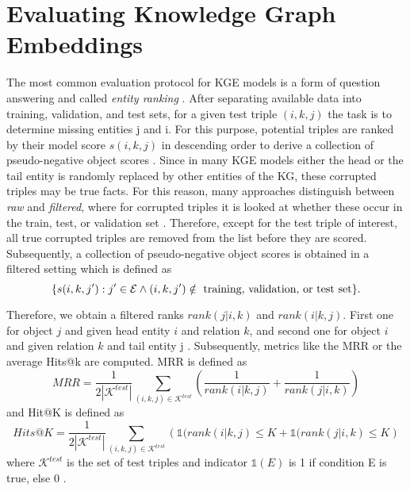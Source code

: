 \section{Evaluating Knowledge Graph Embeddings} 
\label{sec:evaluating_knowledge_graph_embeddings}
%
The most common evaluation protocol for \ac{KGE} models is a form of question answering and called \textit{entity ranking} \cite{Ruffinelli2020You}.
After separating available data into training, validation, and test sets, for a given test triple $(i,k,j)$ the task is to determine missing entities j and i.
For this purpose, potential triples are ranked by their model score $s(i, k, j)$ in descending order to derive a collection of pseudo-negative object scores \cite{Ruffinelli2020You}.
Since in many \ac{KGE} models either the head or the tail entity is randomly replaced by other entities of the \ac{KG}, these corrupted triples may be true facts.
For this reason, many approaches distinguish between \textit{raw} and \textit{filtered}, where for corrupted triples it is looked at whether these occur in the train, test, or validation set \cite{TransE}.
Therefore, except for the test triple of interest, all true corrupted triples are removed from the list before they are scored.
Subsequently, a collection of pseudo-negative object scores is obtained in a filtered setting  which is defined as \cite{Ruffinelli2020You}
$$\{ s(i, k, j') : j' \in \mathcal{E} \wedge (i, k, j') \notin \text{ training, validation, or test set}\}.$$

Therefore, we obtain a filtered ranks $rank(j|i, k)$ and $rank(i|k, j)$.
First one for object $j$ and given head entity $i$ and relation $k$, 
and second one for object $i$ and given relation $k$ and tail entity j \cite{Ruffinelli2020You}.
Subsequently, metrics like the \ac{MRR} or the average Hits@k are computed.
MRR is defined as \cite{Ruffinelli2020You}
\begin{equation}
    MRR = \frac{1}{2 |\mathcal{K}^{test}|} \sum_{(i,k,j) \in  \mathcal{K}^{test}} \left( \frac{1}{rank(i |k,j)} + \frac{1}{rank(j|i,k)} \right)
\end{equation}
and Hit@K is defined as \cite{Ruffinelli2020You}
\begin{equation}
    Hits@K = \frac{1}{2|\mathcal{K}^{test}|} \sum_{(i,k,j) \in  \mathcal{K}^{test}} \left( \mathds{1} (rank(i |k,j) \leq K + \mathds{1}  (rank(j|i,k) \leq K \right)
\end{equation}
where $\mathcal{K}^{test}$ is the set of test triples and indicator $\mathds{1}(E)$ is 1 if condition E is true, else 0 \cite{Ruffinelli2020You}.